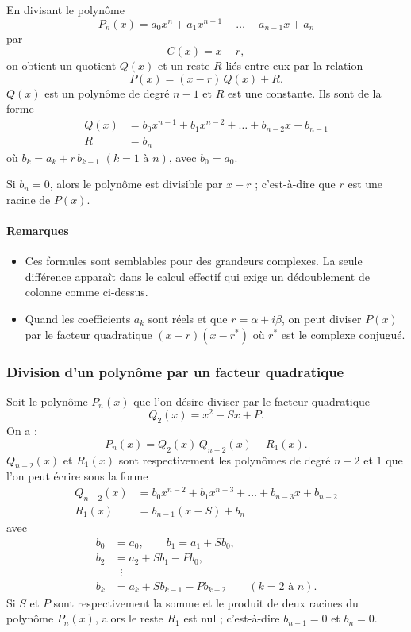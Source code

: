 En divisant le polynôme
\[
  P_n(x) = a_0x^n + a_1x^{n-1} + \dots + a_{n-1}x + a_n
\]
par
\[
  C(x) = x - r ,
\]
on obtient un quotient $Q(x)$ et un reste $R$ liés entre eux par la relation
\[
  P(x) = (x - r)\,Q(x) + R .
\]
$Q(x)$ est un polynôme de degré $n-1$ et $R$ est une constante. Ils sont de la
forme
\[
  \begin{aligned}
    Q(x) &= b_0x^{n-1} + b_1x^{n-2} + \dots + b_{n-2}x + b_{n-1}\\
    R &= b_n
  \end{aligned}
\]
où $b_k = a_k + r\,b_{k-1}$ $(k = 1 \text{ à } n)$, avec $b_0 = a_0$.

Si $b_n = 0$, alors le polynôme est divisible par $x - r$ ; c'est-à-dire que
$r$ est une racine de $P(x)$.

\paragraph{Remarques}
\begin{itemize}
  \item[$*$] Ces formules sont semblables pour des grandeurs complexes. La
        seule différence apparaît dans le calcul effectif qui exige un
        dédoublement de colonne comme ci-dessus.
  \item[$**$] Quand les coefficients $a_k$ sont réels et que
        $r = \alpha + i\beta$, on peut diviser $P(x)$ par le facteur
        quadratique $(x - r)(x - r^*)$ où $r^*$ est le complexe conjugué.
\end{itemize}

\subsubsection{Division d'un polynôme par un facteur quadratique}

Soit le polynôme $P_n(x)$ que l'on désire diviser par le facteur quadratique
\[
  Q_2(x) = x^2 - Sx + P .
\]
On a :
\[
  P_n(x) = Q_2(x)\,Q_{n-2}(x) + R_1(x) .
\]
$Q_{n-2}(x)$ et $R_1(x)$ sont respectivement les polynômes de degré $n-2$ et
$1$ que l'on peut écrire sous la forme
\[
  \begin{aligned}
    Q_{n-2}(x) &= b_0x^{n-2} + b_1x^{n-3} + \dots + b_{n-3}x + b_{n-2}\\
    R_1(x) &= b_{n-1}(x - S) + b_n
  \end{aligned}
\]
avec
\[
  \begin{aligned}
    b_0 &= a_0, \qquad b_1 = a_1 + Sb_0,\\
    b_2 &= a_2 + Sb_1 - Pb_0,\\
    &\;\;\vdots\\
    b_k &= a_k + Sb_{k-1} - Pb_{k-2} \qquad (k = 2 \text{ à } n).
  \end{aligned}
\]
Si $S$ et $P$ sont respectivement la somme et le produit de deux racines du
polynôme $P_n(x)$, alors le reste $R_1$ est nul ; c'est-à-dire $b_{n-1} = 0$
et $b_n = 0$.

